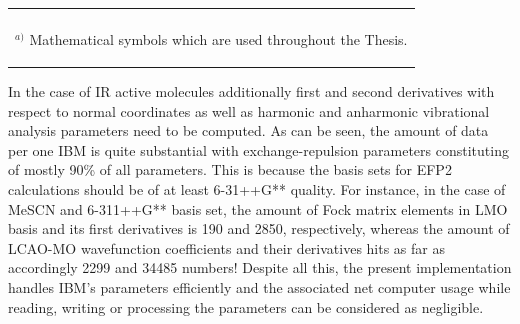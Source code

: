 \documentclass[b5paper,oneside,fleqn,11pt]{book}
\begin{document}
\begin{refsection}
\begin{landscape}
\begin{longtable}{ p{} p{} p{} p{} p{} }
\hline\hline
\\
%
\multicolumn{5}{l}{
\begin{footnotesize}
$^{a)}$ Mathematical symbols which are used throughout the Thesis.
\end{footnotesize}
}
\end{longtable}
\end{landscape}
%
In the case of IR active molecules additionally first and second
derivatives with respect to normal coordinates as well as
harmonic and anharmonic vibrational analysis parameters
need to be computed. As can be seen, the amount of data per one IBM is quite
substantial with exchange\hyp{}repulsion parameters constituting of mostly 90\% 
of all parameters. This is because the basis sets for EFP2 calculations
should be of at least 6-31++G** quality.
For instance, in the case of MeSCN and 6-311++G** basis set, 
the amount of Fock matrix elements in LMO basis
and its first derivatives
is 190 and 2850, respectively,
whereas the amount of LCAO-MO wavefunction coefficients and their derivatives
hits as far as accordingly 2299 and 34485 numbers!
Despite all this, the present implementation handles IBM's parameters
efficiently and the associated net computer usage while reading, writing
or processing the parameters
can be considered as negligible.


\end{refsection}
\end{document}

